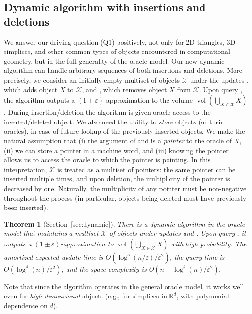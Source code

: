 \documentclass[11pt]{article}
\def\Real{\mathbb{R}}
\let\R\Real
\def\vol{\operatorname{vol}}		%
\newtheorem{theorem}{Theorem}[section]
\newcommand{\eps}{\varepsilon}
\newcommand{\class}[1]{\mathcal{#1}}
\begin{document}
\subsection{Dynamic algorithm with insertions and deletions}
We answer our driving question (Q1) positively, not only for 2D triangles, 3D simplices, and other common types of objects encountered in computational geometry, but in the full generality of the oracle model.  Our new dynamic algorithm can handle arbitrary sequences of both insertions and deletions.
%
More precisely, we consider an initially empty multiset of objects $\class{X}$ under the updates , which adds object $X$ to $\class{X}$, and , which removes object $X$ from $\class{X}$. Upon query \est{}, the algorithm outputs a $(1\pm\eps)$-approximation to the volume $\vol\left(\bigcup_{X \in \class{X}} X\right)$.
%
During insertion/deletion the algorithm is given oracle access to the inserted/deleted object. We also need the ability to \emph{store} objects (or their oracles), in case of future lookup of the previously inserted objects. We make the natural assumption that (i) the argument of  and  is a \emph{pointer} to the oracle of $X$, (ii) we can store a pointer in a machine word, and (iii) knowing the pointer allows us to access the oracle to which the pointer is pointing. In this interpretation, $\class{X}$ is treated as a multiset of pointers: the same pointer can be inserted multiple times, and upon deletion, the multiplicity of the pointer is decreased by one. Naturally, the multiplicity of any pointer must be non-negative throughout the process (in particular, objects being deleted must have previously been inserted).
%
\begin{theorem}[Section~\ref{sec:dynamic}]
\label{thm:dynamicalgo}%
There is a dynamic algorithm in the oracle model that maintains a multiset $\class{X}$ of objects under updates  and . Upon query \est{}, it outputs a $(1\pm\eps)$-approximation to $\vol\left(\bigcup_{X \in \class{X}} X\right)$ with high probability. The amortized expected update time is $O(\log^5(n/\eps)/\eps^2)$, the query time is $O(\log^4(n)/\eps^2)$, and the space complexity is $O(n + \log^4(n)/\eps^2)$.
\end{theorem}
%
Note that since the algorithm operates in the general oracle model, it works well even for \emph{high-dimensional} objects (e.g., for simplices in $\R^d$, with polynomial dependence on $d$).
%
%
\end{document}
